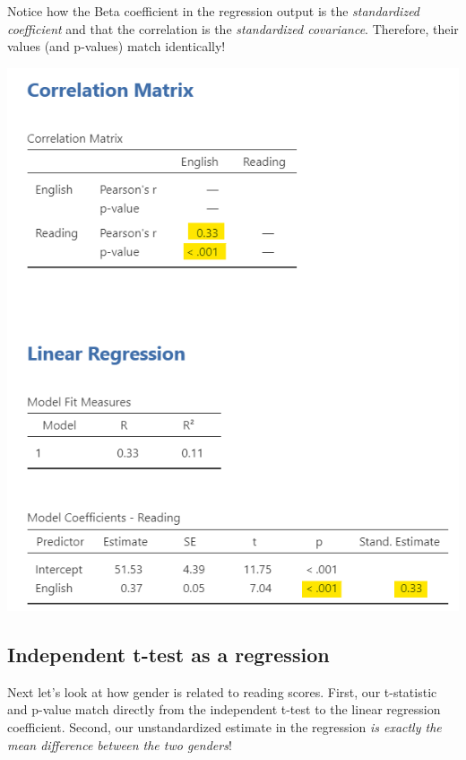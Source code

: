 \documentclass[
]{book}
\begin{document}
Notice how the Beta coefficient in the regression output is the \emph{standardized coefficient} and that the correlation is the \emph{standardized covariance}. Therefore, their values (and p-values) match identically!

\includegraphics{images/14-regression-wrap-up/correlation.png}

\hypertarget{independent-t-test-as-a-regression}{%
\subsection{Independent t-test as a regression}\label{independent-t-test-as-a-regression}}

Next let's look at how gender is related to reading scores. First, our t-statistic and p-value match directly from the independent t-test to the linear regression coefficient. Second, our unstandardized estimate in the regression \emph{is exactly the mean difference between the two genders}!
\end{document}
